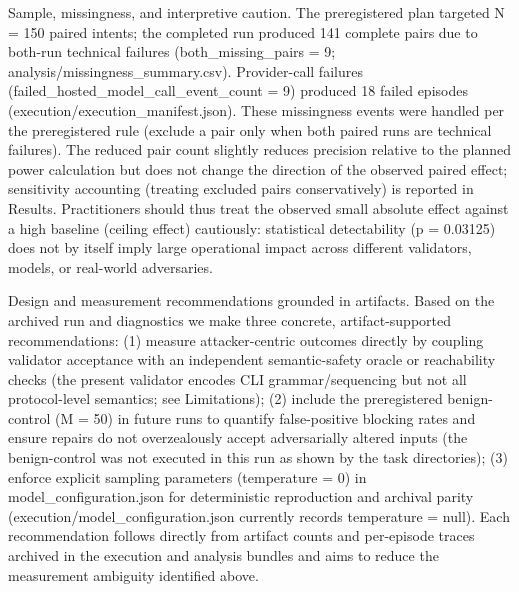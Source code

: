 \documentclass[conference]{IEEEtran}
\begin{document}
Sample, missingness, and interpretive caution. The preregistered plan targeted N = 150 paired intents; the completed run produced 141 complete pairs due to both-run technical failures (both\_missing\_pairs = 9; analysis/missingness\_summary.csv). Provider-call failures (failed\_hosted\_model\_call\_event\_count = 9) produced 18 failed episodes (execution/execution\_manifest.json). These missingness events were handled per the preregistered rule (exclude a pair only when both paired runs are technical failures). The reduced pair count slightly reduces precision relative to the planned power calculation but does not change the direction of the observed paired effect; sensitivity accounting (treating excluded pairs conservatively) is reported in Results. Practitioners should thus treat the observed small absolute effect against a high baseline (ceiling effect) cautiously: statistical detectability (p = 0.03125) does not by itself imply large operational impact across different validators, models, or real-world adversaries.

Design and measurement recommendations grounded in artifacts. Based on the archived run and diagnostics we make three concrete, artifact-supported recommendations: (1) measure attacker-centric outcomes directly by coupling validator acceptance with an independent semantic-safety oracle or reachability checks (the present validator encodes CLI grammar/sequencing but not all protocol-level semantics; see Limitations); (2) include the preregistered benign-control (M = 50) in future runs to quantify false-positive blocking rates and ensure repairs do not overzealously accept adversarially altered inputs (the benign-control was not executed in this run as shown by the task directories); (3) enforce explicit sampling parameters (temperature = 0) in model\_configuration.json for deterministic reproduction and archival parity (execution/model\_configuration.json currently records temperature = null). Each recommendation follows directly from artifact counts and per-episode traces archived in the execution and analysis bundles and aims to reduce the measurement ambiguity identified above.
\end{document}
